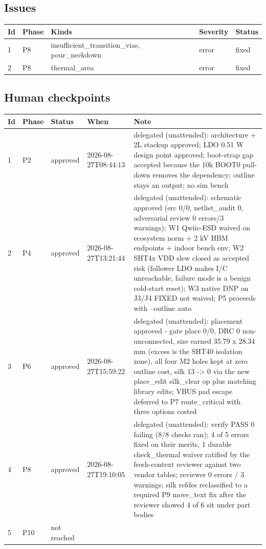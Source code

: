 \documentclass[11pt,a4paper]{article}
\begin{document}
\subsection*{Issues}
{\small
\begin{longtable}{llp{5cm}ll}
\toprule
\textbf{Id} & \textbf{Phase} & \textbf{Kinds} & \textbf{Severity} & \textbf{Status} \\
\midrule
\endhead
1 & P8 & insufficient\_transition\_vias, pour\_neckdown & error & fixed \\
2 & P8 & thermal\_area & error & fixed \\
\bottomrule
\end{longtable}
}
\subsection*{Human checkpoints}
{\small
\begin{longtable}{lllp{2.6cm}p{6.4cm}}
\toprule
\textbf{Id} & \textbf{Phase} & \textbf{Status} & \textbf{When} & \textbf{Note} \\
\midrule
\endhead
1 & P2 & approved & 2026-08-27T08:44:13 & delegated (unattended): architecture + 2L stackup approved; LDO 0.51 W design point approved; boot-strap gap accepted because the 10k BOOT0 pull-down removes the dependency; outline stays an output; no sim bench \\
2 & P4 & approved & 2026-08-27T13:21:44 & delegated (unattended): schematic approved (erc 0/0, netlist\_audit 0, adversarial review 0 errors/3 warnings); W1 Qwiic-ESD waived on ecosystem norm + 2 kV HBM endpoints + indoor bench env; W2 SHT4x VDD slew closed as accepted risk (follower LDO makes I/C unreachable, failure mode is a benign cold-start reset); W3 native DNP on J3/J4 FIXED not waived; P5 proceeds with --outline auto \\
3 & P6 & approved & 2026-08-27T15:59:22 & delegated (unattended): placement approved - gate place 0/0, DRC 0 non-unconnected, size earned 35.79 x 28.34 mm (excess is the SHT40 isolation zone), all four M2 holes kept at zero outline cost, silk 13 -\textgreater{} 0 via the new place\_edit silk\_clear op plus matching library edits; VBUS pad escape deferred to P7 route\_critical with three options costed \\
4 & P8 & approved & 2026-08-27T19:10:05 & delegated (unattended): verify PASS 0 failing (8/8 checks ran); 4 of 5 errors fixed on their merits, 1 durable check\_thermal waiver ratified by the fresh-context reviewer against two vendor tables; reviewer 0 errors / 3 warnings; silk refdes reclassified to a required P9 move\_text fix after the reviewer showed 4 of 6 sit under part bodies \\
5 & P10 & not reached &  &  \\
\bottomrule
\end{longtable}
}
\end{document}
